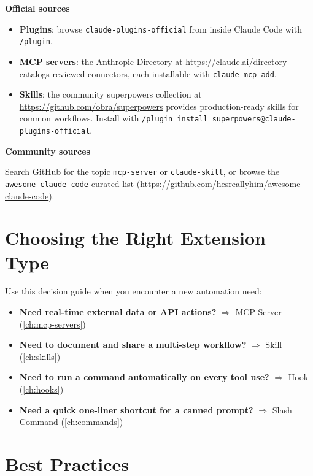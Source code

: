 \textbf{Official sources}

\begin{itemize}
  \item \textbf{Plugins}: browse \texttt{claude-plugins-official} from
        inside Claude Code with \texttt{/plugin}.
  \item \textbf{MCP servers}: the Anthropic Directory at
        \url{https://claude.ai/directory} catalogs reviewed connectors,
        each installable with \texttt{claude mcp add}.
  \item \textbf{Skills}: the community superpowers collection at
        \url{https://github.com/obra/superpowers} provides production-ready
        skills for common workflows. Install with
        \texttt{/plugin install superpowers@claude-plugins-official}.
\end{itemize}

\textbf{Community sources}

Search GitHub for the topic \texttt{mcp-server} or \texttt{claude-skill}, or
browse the \texttt{awesome-claude-code} curated list
(\url{https://github.com/hesreallyhim/awesome-claude-code}).

\section{Choosing the Right Extension Type}
\label{sec:choosing}

Use this decision guide when you encounter a new automation need:

\begin{itemize}
  \item \textbf{Need real-time external data or API actions?} $\Rightarrow$
        MCP Server (\cref{ch:mcp-servers})
  \item \textbf{Need to document and share a multi-step workflow?} $\Rightarrow$
        Skill (\cref{ch:skills})
  \item \textbf{Need to run a command automatically on every tool use?}
        $\Rightarrow$ Hook (\cref{ch:hooks})
  \item \textbf{Need a quick one-liner shortcut for a canned prompt?}
        $\Rightarrow$ Slash Command (\cref{ch:commands})
\end{itemize}

\section{Best Practices}

